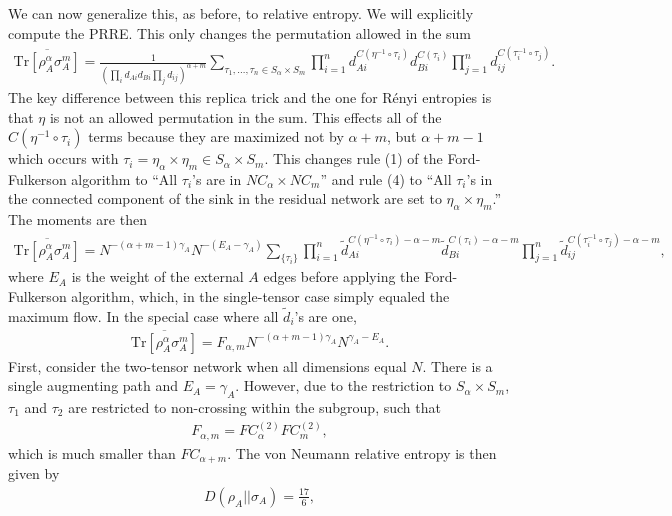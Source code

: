 \documentclass[a4paper,11pt]{article}
\newcommand{\Tr}{\text{Tr}}
\begin{document}
We can now generalize this, as before, to relative entropy. We will explicitly compute the PRRE. This only changes the permutation allowed in the sum 
\begin{align}
    \overline{\Tr\left[ \rho_A^{\alpha}\sigma_A^m\right]} = \frac{1}{(\prod_{i}d_{Ai} d_{Bi}\prod_j d_{ij})^{\alpha+m}} \sum_{\tau_1, \dots, \tau_n \in S_{\alpha}\times S_m}\prod_{i=1}^n d_{Ai}^{C(\eta^{-1}\circ \tau_i)} d_{Bi}^{C(\tau_i)}\prod_{j=1}^n d_{ij}^{C(\tau_i^{-1} \circ \tau_j)}.
\end{align}
The key difference between this replica trick and the one for R\'enyi entropies is that $\eta$ is not an allowed permutation in the sum. This effects all of the $C(\eta^{-1}\circ \tau_i)$ terms because they are maximized not by $\alpha + m$, but $\alpha + m -1$ which occurs with $\tau_i = \eta_{\alpha} \times \eta_{m} \in S_{\alpha}\times S_m$. This changes rule (1) of the Ford-Fulkerson algorithm to ``All $\tau_i$'s are in $NC_{\alpha}\times NC_m$'' and rule (4) to  ``All $\tau_i$'s in the connected component of the sink in the residual network are set to $\eta_{\alpha} \times \eta_{m}$.'' The moments are then
\begin{align}
    \overline{\Tr\left[ \rho_A^{\alpha}\sigma_A^m\right]} =N^{ - (\alpha + m-1) \gamma_A }N^{-(E_A-\gamma_A)} \sum_{\{\tau_i\}}\prod_{i=1}^n \tilde{d}_{Ai}^{C(\eta^{-1}\circ \tau_i)-\alpha-m} \tilde{d}_{Bi}^{C(\tau_i)-\alpha-m}\prod_{j=1}^n \tilde{d}_{ij}^{C(\tau_i^{-1} \circ \tau_j)-\alpha-m},
\end{align}
where $E_A$ is the weight of the external $A$ edges before applying the Ford-Fulkerson algorithm, which, in the single-tensor case simply equaled the maximum flow. In the special case where all $\tilde{d}_i$'s are one,
\begin{align}
    \overline{\Tr\left[ \rho_A^{\alpha}\sigma_A^m\right]} = F_{\alpha,m} N^{ - (\alpha + m-1) \gamma_A }N^{\gamma_A-E_A} .
\end{align}
First, consider the two-tensor network when all dimensions equal $N$. There is a single augmenting path and $E_A = \gamma_A$. However, due to the restriction to $S_{\alpha}\times S_m$, $\tau_1$ and $\tau_2$ are restricted to non-crossing within the subgroup, such that
\begin{align}
    F_{\alpha,m} = FC^{(2)}_{\alpha}FC^{(2)}_{m},
\end{align}
which is much smaller than $FC_{\alpha +m }$. The von Neumann relative entropy is then given by
\begin{align}
    D(\rho_A||\sigma_A) = \frac{17}{6},
\end{align}
\end{document}
